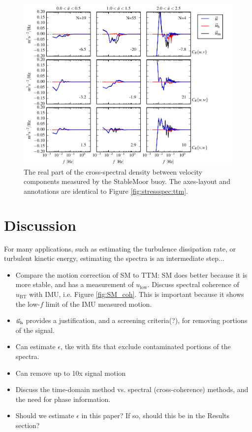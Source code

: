 \documentclass[twocol]{ametsoc}
\begin{document}
\begin{figure}[t]
  \centering
  \includegraphics{StressSpec_SM_03}
  \caption{The real part of the cross-spectral density between velocity components measured by the StableMoor buoy. The axes-layout and annotations are identical to Figure \ref{fig:stressspec:ttm}.}
  \label{fig:stressspec:sm}
\end{figure}



\section{Discussion}

For many applications, such as estimating the turbulence dissipation rate, or turbulent kinetic energy, estimating the spectra is an intermediate step...
\begin{itemize}
\item Compare the motion correction of SM to TTM: SM does better because it is more stable, and has a measurement of $u_\mathrm{low}$. Discuss spectral coherence of $u_\mathrm{BT}$ with IMU, i.e. Figure \ref{fig:SM_coh}. This is important because it shows the low-$f$ limit of the IMU measured motion.
\item $\vec{u}_\mathrm{h}$ provides a justification, and a screening criteria(?), for removing portions of the signal.
\item Can estimate $\epsilon$, tke with fits that exclude contaminated portions of the spectra.
\item Can remove up to 10x signal motion
\item Discuss the time-domain method vs. spectral (cross-coherence) methods, and the need for phase information.
\item Should we estimate $\epsilon$ in this paper? If so, should this be in the Results section?
\end{itemize}
\end{document}
